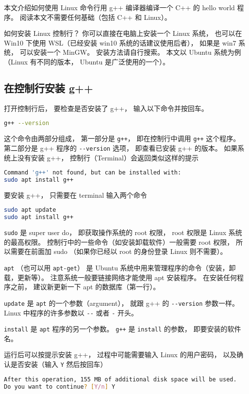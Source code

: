 
本文介绍如何使用 Linux 命令行用 g++ 编译器编译一个 C++ 的 hello world 程序。 阅读本文不需要任何基础（包括 C++ 和 Linux）。

如何安装 Linux 控制行？ 你可以直接在电脑上安装一个 Linux 系统， 也可以在 Win10 下使用 WSL（已经安装 win10 系统的话建议使用后者）， 如果是 win7 系统， 可以安装一个 MinGW。 安装方法请自行搜索。 本文以 Ubuntu 系统为例（Linux 有不同的版本， Ubuntu 是广泛使用的一个）。

\subsection{在控制行安装 g++}
打开控制行后， 要检查是否安装了 g++， 输入以下命令并按回车。
\begin{lstlisting}[language=bash]
g++ --version
\end{lstlisting}
这个命令由两部分组成， 第一部分是 \verb|g++|， 即在控制行中调用 \verb|g++| 这个程序。 第二部分是 g++ 程序的 \verb|--version| 选项， 即查看已安装 g++ 的版本。 如果系统上没有安装 g++， 控制行（Terminal）会返回类似这样的提示
\begin{lstlisting}[language=bash]
Command 'g++' not found, but can be installed with:
sudo apt install g++
\end{lstlisting}
要安装 g++， 只需要在 terminal 输入两个命令
\begin{lstlisting}[language=bash]
sudo apt update
sudo apt install g++
\end{lstlisting}
\verb|sudo| 是 super user do， 即获取操作系统的 root 权限， root 权限是 Linux 系统的最高权限。 控制行中的一些命令（如安装卸载软件）一般需要 root 权限， 所以需要在前面加 sudo （如果你已经以 root 的身份登录 Linux 则不需要）。

\verb|apt| （也可以用 \verb|apt-get|） 是 Ubuntu 系统中用来管理程序的命令（安装，卸载，更新等）。 注意系统一般要链接网络才能使用 apt 安装程序。 在安装任何程序之前， 建议新更新一下 apt 的数据库（第一行）。

\verb|update| 是 \verb|apt| 的一个参数（argument）， 就跟 g++ 的 \verb|--version| 参数一样。 Linux 中程序的许多参数以 \verb|--| 或者 \verb|-| 开头。

\verb|install| 是 \verb|apt| 程序的另一个参数。 \verb|g++| 是 \verb|install| 的参数， 即要安装的软件名。

运行后可以按提示安装 g++， 过程中可能需要输入 Linux 的用户密码， 以及确认是否安装（输入 \verb|Y| 然后按回车）
\begin{lstlisting}[language=bash]
After this operation, 155 MB of additional disk space will be used.
Do you want to continue? [Y/n] Y
\end{lstlisting}


